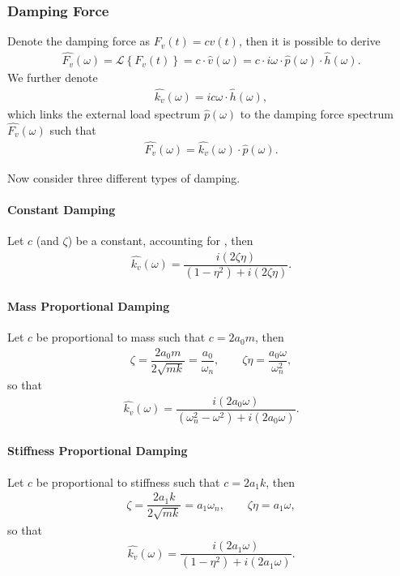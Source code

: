 \subsubsection{Damping Force}
Denote the damping force as $F_v\left(t\right)=cv\left(t\right)$, then it is possible to derive
\begin{gather}
\hat{F_v}\left(\omega\right)=\mathscr{L}\left\{F_v\left(t\right)\right\}=c\cdot{}\hat{v}\left(\omega\right)=c\cdot{}i\omega\cdot{}\hat{p}\left(\omega\right)\cdot\hat{h}\left(\omega\right).
\end{gather}
We further denote
\begin{gather}
\hat{k_v}\left(\omega\right)=ic\omega\cdot\hat{h}\left(\omega\right),
\end{gather}
which links the external load spectrum $\hat{p}\left(\omega\right)$ to the damping force spectrum $\hat{F_v}\left(\omega\right)$ such that
\begin{gather}\label{eq:damping_force_spec}
\hat{F_v}\left(\omega\right)=\hat{k_v}\left(\omega\right)\cdot\hat{p}\left(\omega\right).
\end{gather}

Now consider three different types of damping.
\paragraph{Constant Damping}
Let $c$ (and $\zeta$) be a constant, accounting for , then
\begin{gather}\label{eq:damping_constant}
\hat{k_v}\left(\omega\right)=\dfrac{i\left(2\zeta\eta\right)}{\left(1-\eta^2\right)+i\left(2\zeta\eta\right)}.
\end{gather}
\paragraph{Mass Proportional Damping}
Let $c$ be proportional to mass such that $c=2a_0m$, then
\begin{gather}
\zeta=\dfrac{2a_0m}{2\sqrt{mk}}=\dfrac{a_0}{\omega_n},\qquad
\zeta\eta=\dfrac{a_0\omega}{\omega_n^2},
\end{gather}
so that
\begin{gather}\label{eq:damping_mass}
\hat{k_v}\left(\omega\right)=\dfrac{i\left(2a_0\omega\right)}{\left(\omega_n^2-\omega^2\right)+i\left(2a_0\omega\right)}.
\end{gather}
\paragraph{Stiffness Proportional Damping}
Let $c$ be proportional to stiffness such that $c=2a_1k$, then
\begin{gather}
\zeta=\dfrac{2a_1k}{2\sqrt{mk}}=a_1\omega_n,\qquad
\zeta\eta=a_1\omega,
\end{gather}
so that
\begin{gather}\label{eq:damping_stiffness}
\hat{k_v}\left(\omega\right)=\dfrac{i\left(2a_1\omega\right)}{\left(1-\eta^2\right)+i\left(2a_1\omega\right)}.
\end{gather}


